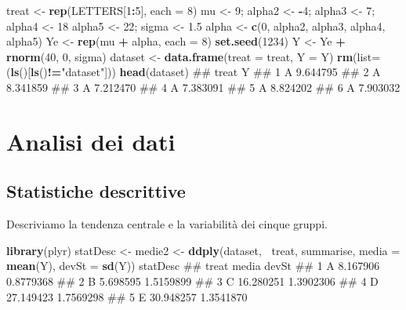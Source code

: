 \documentclass[a4paper,12pt,oneside]{book}
\newenvironment{Shaded}{\begin{snugshade}}{\end{snugshade}}
\newcommand{\KeywordTok}[1]{\textcolor[rgb]{0.13,0.29,0.53}{\textbf{#1}}}
\newcommand{\DataTypeTok}[1]{\textcolor[rgb]{0.13,0.29,0.53}{#1}}
\newcommand{\DecValTok}[1]{\textcolor[rgb]{0.00,0.00,0.81}{#1}}
\newcommand{\FloatTok}[1]{\textcolor[rgb]{0.00,0.00,0.81}{#1}}
\newcommand{\StringTok}[1]{\textcolor[rgb]{0.31,0.60,0.02}{#1}}
\newcommand{\OperatorTok}[1]{\textcolor[rgb]{0.81,0.36,0.00}{\textbf{#1}}}
\newcommand{\NormalTok}[1]{#1}
\theoremstyle{definition}
\theoremstyle{definition}
\theoremstyle{definition}
\theoremstyle{remark}
\begin{document}
\begin{Shaded}
\begin{Highlighting}[]
\NormalTok{treat <-}\StringTok{ }\KeywordTok{rep}\NormalTok{(LETTERS[}\DecValTok{1}\OperatorTok{:}\DecValTok{5}\NormalTok{], }\DataTypeTok{each =} \DecValTok{8}\NormalTok{)}
\NormalTok{mu <-}\StringTok{ }\DecValTok{9}\NormalTok{; alpha2 <-}\StringTok{ }\OperatorTok{-}\DecValTok{4}\NormalTok{; alpha3 <-}\StringTok{ }\DecValTok{7}\NormalTok{; alpha4 <-}\StringTok{ }\DecValTok{18}
\NormalTok{alpha5 <-}\StringTok{ }\DecValTok{22}\NormalTok{; sigma <-}\StringTok{ }\FloatTok{1.5}
\NormalTok{alpha <-}\StringTok{ }\KeywordTok{c}\NormalTok{(}\DecValTok{0}\NormalTok{, alpha2, alpha3, alpha4, alpha5)}
\NormalTok{Ye <-}\StringTok{ }\KeywordTok{rep}\NormalTok{(mu }\OperatorTok{+}\StringTok{ }\NormalTok{alpha, }\DataTypeTok{each =} \DecValTok{8}\NormalTok{)}
\KeywordTok{set.seed}\NormalTok{(}\DecValTok{1234}\NormalTok{)}
\NormalTok{Y <-}\StringTok{ }\NormalTok{Ye }\OperatorTok{+}\StringTok{ }\KeywordTok{rnorm}\NormalTok{(}\DecValTok{40}\NormalTok{, }\DecValTok{0}\NormalTok{, sigma)}
\NormalTok{dataset <-}\StringTok{ }\KeywordTok{data.frame}\NormalTok{(}\DataTypeTok{treat =}\NormalTok{ treat, }\DataTypeTok{Y =}\NormalTok{ Y)}
\KeywordTok{rm}\NormalTok{(}\DataTypeTok{list=}\NormalTok{(}\KeywordTok{ls}\NormalTok{()[}\KeywordTok{ls}\NormalTok{()}\OperatorTok{!=}\StringTok{"dataset"}\NormalTok{]))}
\KeywordTok{head}\NormalTok{(dataset)}
\NormalTok{##   treat        Y}
\NormalTok{## 1     A 9.644795}
\NormalTok{## 2     A 8.341859}
\NormalTok{## 3     A 7.212470}
\NormalTok{## 4     A 7.383091}
\NormalTok{## 5     A 8.824202}
\NormalTok{## 6     A 7.903032}
\end{Highlighting}
\end{Shaded}

\section{Analisi dei dati}\label{analisi-dei-dati}

\subsection{Statistiche descrittive}\label{statistiche-descrittive}

Descriviamo la tendenza centrale e la variabilità dei cinque gruppi.

\begin{Shaded}
\begin{Highlighting}[]
\KeywordTok{library}\NormalTok{(plyr)}
\NormalTok{statDesc <-}\StringTok{ }\NormalTok{medie2 <-}\StringTok{ }\KeywordTok{ddply}\NormalTok{(dataset, }\OperatorTok{~}\NormalTok{treat, summarise, }\DataTypeTok{media =} \KeywordTok{mean}\NormalTok{(Y), }\DataTypeTok{devSt =} \KeywordTok{sd}\NormalTok{(Y))}
\NormalTok{statDesc}
\NormalTok{##   treat     media     devSt}
\NormalTok{## 1     A  8.167906 0.8779368}
\NormalTok{## 2     B  5.698595 1.5159899}
\NormalTok{## 3     C 16.280251 1.3902306}
\NormalTok{## 4     D 27.149423 1.7569298}
\NormalTok{## 5     E 30.948257 1.3541870}
\end{Highlighting}
\end{Shaded}
\end{document}
